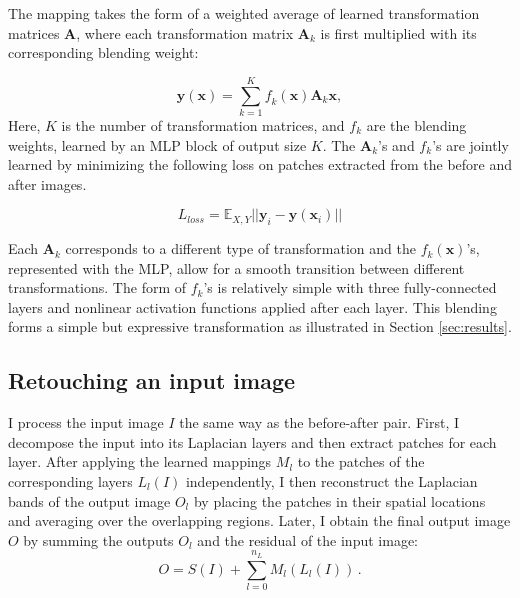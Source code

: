 The mapping takes the form of a weighted average of learned transformation matrices $\mathbf{A}$, where each transformation matrix $\mathbf{A}_k$ is first multiplied with its corresponding blending weight: 

\begin{equation} 
	\mathbf{y} (\mathbf{x}) = \sum_{k=1}^K
	\mathit{f}_k (\mathbf{x}) \mathbf{A}_k \mathbf{x},
	\label{eq:weightedSum}
\end{equation} 
Here, $K$ is the number of transformation matrices, and $f_k$ are the blending weights, learned by an \gls{MLP} block of output size $K$. The $\mathbf{A}_k$'s and $f_k$'s are jointly learned by minimizing the following loss on patches extracted from the before and after images.

\begin{equation}
    L_{loss}  = \mathbb{E}_{X, Y} || \mathbf{y}_i -   \mathbf{y} (\mathbf{x}_i) ||
\end{equation}

Each $\mathbf{A}_k$ corresponds to a different type of transformation and the $f_k(\mathbf{x})$'s, represented with the \gls{MLP}, allow for a smooth transition between different transformations. The form of $f_k$'s is relatively simple with three fully-connected layers and nonlinear activation functions applied after each layer. This blending forms a simple but expressive transformation as illustrated in Section \ref{sec:results}.


\subsection{Retouching an input image}

I process the input image $I$ the same way as the before-after pair. First, I decompose the input into its Laplacian layers and then extract patches for each layer. After applying the learned mappings $M_l$ to the patches of the corresponding layers $L_{l}(I)$ independently, I then reconstruct the Laplacian bands of the output image $O_l$ by placing the patches in their spatial locations and averaging over the overlapping regions. Later, I obtain the final output image $O$ by summing the outputs $O_l$ and the residual of the input image:
\begin{equation}
    O = S(I) + \sum_{l=0}^{n_L} M_l(L_l(I))\,.
\end{equation}

